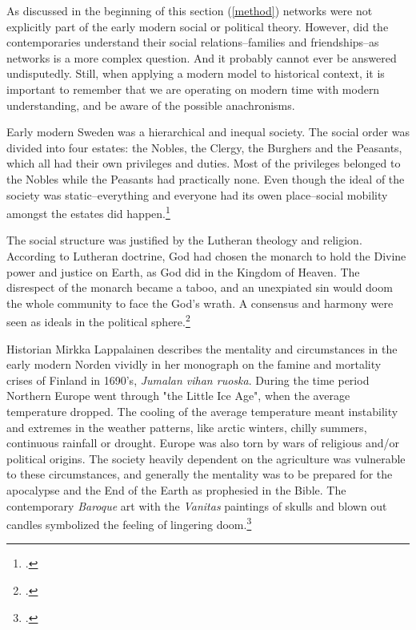 As discussed in the beginning of this section (\ref{method}) networks were not explicitly part of the early modern social or political theory. However, did the contemporaries understand their social relations–families and friendships–as networks is a more complex question. And it probably cannot ever be answered undisputedly. Still, when applying a modern model to historical context, it is important to remember that we are operating on modern time with modern understanding, and be aware of the possible anachronisms.

Early modern Sweden was a hierarchical and inequal society. The social order was divided into four estates: the Nobles, the Clergy, the Burghers and the Peasants, which all had their own privileges and duties. Most of the privileges belonged to the Nobles while the Peasants had practically none. Even though the ideal of the society was static–everything and everyone had its owen place–social mobility amongst the estates did happen.\footcites[pp. 21-23,]{hopesAndFearsIntro}[pp. 21-22.]{agencyAndStateBuilding} 

The social structure was justified by the Lutheran theology and religion. According to Lutheran doctrine, God had chosen the monarch to hold the Divine power and justice on Earth, as God did in the Kingdom of Heaven. The disrespect of the monarch became a taboo, and an unexpiated sin would doom the whole community to face the God's wrath. A consensus and harmony were seen as ideals in the political sphere.\footcites[pp. 24-28,]{hopesAndFearsIntro}[pp. 161-163.]{pSuurvalta}

Historian Mirkka Lappalainen describes the mentality and circumstances in the early modern Norden vividly in her monograph on the famine and mortality crises of Finland in 1690's, \textit{Jumalan vihan ruoska}. During the time period Northern Europe went through "the Little Ice Age", when the average temperature dropped. The cooling of the average temperature meant instability and extremes in the weather patterns, like arctic winters, chilly summers, continuous rainfall or drought. Europe was also torn by wars of religious and/or political origins. The society heavily dependent on the agriculture was vulnerable to these circumstances, and generally the mentality was to be prepared for the apocalypse and the End of the Earth as prophesied in the Bible. The contemporary \textit{Baroque} art with the \textit{Vanitas} paintings of skulls and blown out candles symbolized the feeling of lingering doom.\footcite[pp. 23-25.]{lappalainen12} 

